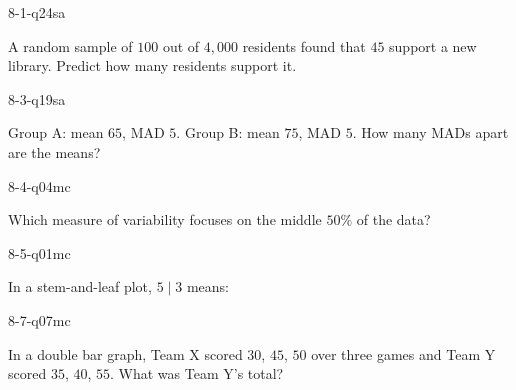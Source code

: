 \begin{practiceQuestion}{8-1-q24}{sa}
\begin{questionText}
A random sample of $100$ out of $4{,}000$ residents found that $45$ support a new library. Predict how many residents support it.
\end{questionText}
\end{practiceQuestion}

\begin{practiceQuestion}{8-3-q19}{sa}
\begin{questionText}
Group A: mean $65$, MAD $5$. Group B: mean $75$, MAD $5$. How many MADs apart are the means?
\end{questionText}
\end{practiceQuestion}

\begin{practiceQuestion}{8-4-q04}{mc}
\begin{questionText}
Which measure of variability focuses on the middle $50\%$ of the data?
\end{questionText}
\end{practiceQuestion}

\begin{practiceQuestion}{8-5-q01}{mc}
\begin{questionText}
In a stem-and-leaf plot, $5 \mid 3$ means:
\end{questionText}
\end{practiceQuestion}

\begin{practiceQuestion}{8-7-q07}{mc}
\begin{questionText}
In a double bar graph, Team X scored $30$, $45$, $50$ over three games and Team Y scored $35$, $40$, $55$. What was Team Y's total?
\end{questionText}
\end{practiceQuestion}

